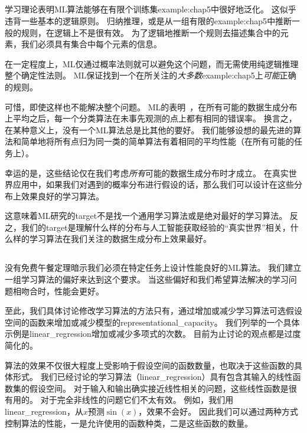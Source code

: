 \subsection{}
\label{sec:the_no_free_lunch_theorem}
学习理论表明\gls{ML}算法能够在有限个训练集\gls{example:chap5}中很好地泛化。
这似乎违背一些基本的逻辑原则。
归纳推理，或是从一组有限的\gls{example:chap5}中推断一般的规则，在逻辑上不是很有效。
为了逻辑地推断一个规则去描述集合中的元素，我们必须具有集合中每个元素的信息。

在一定程度上，\gls{ML}仅通过概率法则就可以避免这个问题，而无需使用纯逻辑推理整个确定性法则。
\gls{ML}保证找到一个在所关注的\emph{大多数}\gls{example:chap5}上\emph{可能}正确的规则。

可惜，即使这样也不能解决整个问题。
\gls{ML}的表明~\citep{Wolpert-1996}，在所有可能的数据生成分布上平均之后，每一个分类算法在未事先观测的点上都有相同的错误率。
换言之，在某种意义上，没有一个\gls{ML}算法总是比其他的要好。
我们能够设想的最先进的算法和简单地将所有点归为同一类的简单算法有着相同的平均性能（在所有可能的任务上）。


幸运的是，这些结论仅在我们考虑\emph{所有}可能的数据生成分布时才成立。
在真实世界应用中，如果我们对遇到的概率分布进行假设的话，那么我们可以设计在这些分布上效果良好的学习算法。

这意味着\gls{ML}研究的\gls{target}不是找一个通用学习算法或是绝对最好的学习算法。
反之，我们的\gls{target}是理解什么样的分布与人工智能获取经验的``真实世界''相关，什么样的学习算法在我们关注的数据生成分布上效果最好。

\subsection{}
\label{sec:regularization}
没有免费午餐定理暗示我们必须在特定任务上设计性能良好的\gls{ML}算法。
我们建立一组学习算法的偏好来达到这个要求。
当这些偏好和我们希望算法解决的学习问题相吻合时，性能会更好。

至此，我们具体讨论修改学习算法的方法只有，通过增加或减少学习算法可选假设空间的函数来增加或减少模型的\gls{representational_capacity}。
我们列举的一个具体示例是\gls{linear_regression}增加或减少多项式的次数。
目前为止讨论的观点都是过度简化的。

算法的效果不仅很大程度上受影响于假设空间的函数数量，也取决于这些函数的具体形式。
我们已经讨论的学习算法（\gls{linear_regression}）具有包含其输入的线性函数集的假设空间。
对于输入和输出确实接近线性相关的问题，这些线性函数是很有用的。
对于完全非线性的问题它们不太有效。
例如，我们用\gls{linear_regression}，从$x$预测$\sin(x)$，效果不会好。
因此我们可以通过两种方式控制算法的性能，一是允许使用的函数种类，二是这些函数的数量。

